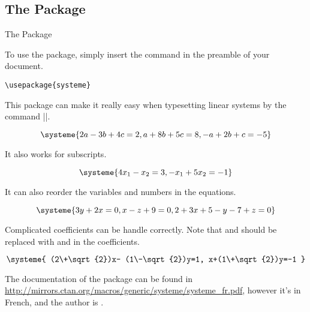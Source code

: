 \subsection{The  Package}

\begin{frame}[fragile]{The  Package}

To use the  package, simply insert the command in the preamble of your document.

\begin{command}
\begin{verbatim}
\usepackage{systeme}
\end{verbatim}
\end{command}

This package can make it really easy when typesetting linear systems by the command \LC|\systeme|.
\begin{latexexamplesplit}
\begin{equation}
  \systeme{
    2a-3b+4c=2,
    a+8b+5c=8,
    -a+2b+c=-5
  }
\end{equation}
\end{latexexamplesplit}

\end{frame}

\begin{frame}[fragile]
It also works for subscripts.
\begin{latexexamplesplit}
\begin{equation}
  \systeme{
    4x_1-x_2=3,
    -x_1+5x_2=-1
  }
\end{equation}
\end{latexexamplesplit}

It can also reorder the variables and numbers in the equations.
\begin{latexexamplesplit}
\begin{equation}
  \systeme{
    3y+2x=0,
    x-z+9=0,
    2+3x+5-y-7+z=0
  }
\end{equation}
\end{latexexamplesplit}

\end{frame}

\begin{frame}[fragile]

Complicated coefficients can be handle correctly. Note that \LC{+} and \LC{-} should be replaced with \LC{\+} and \LC{\-} in the coefficients.
\begin{latexexamplesplit}
\begin{equation}
  \systeme{
    (2\+\sqrt{2})x-
    (1\-\sqrt{2})y=1,
    x+(1\+\sqrt{2})y=-1
  }
\end{equation}
\end{latexexamplesplit}

The documentation of the  package can be found in \url{http://mirrors.ctan.org/macros/generic/systeme/systeme_fr.pdf}, however it's in French, and the author is .

\end{frame}
